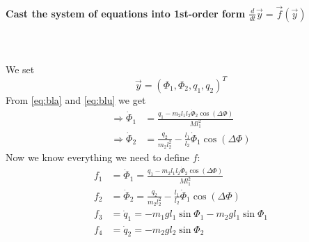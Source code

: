 \documentclass[11 pt]{article}
\begin{document}
        \paragraph{Cast the system of equations into 1st-order form
            $\frac{d}{dt}\vec y=\vec f(\vec y)$
        } \ \\
        \\
        We set
        \begin{equation}
            \vec y=(\Phi_1,\Phi_2,q_1,q_2)^T
        \end{equation}
        From \autoref{eq:bla} and \autoref{eq:blu} we get
        \begin{align}
            \Rightarrow\dot\Phi_1
            &=\frac{q_1-m_2l_1l_2\dot\Phi_2\cos(\Delta\Phi)}{Ml_1^2} \\
            \Rightarrow\dot\Phi_2
            &=\frac{q_2}{m_2l_2^2}-\frac{l_1}{l_2}\dot\Phi_1\cos(\Delta\Phi)
        \end{align}
        Now we know everything we need to define $f$:
        \begin{align}
            f_1&=\dot\Phi_1=
            \frac{q_1-m_2l_1l_2\dot\Phi_2\cos(\Delta\Phi)}{Ml_1^2} \\
            f_2&=\dot\Phi_2=
            \frac{q_2}{m_2l_2^2}-\frac{l_1}{l_2}\dot\Phi_1\cos(\Delta\Phi) \\
            f_3&=\dot{q}_1=-m_1gl_1\sin{\Phi_1}-m_2gl_1\sin{\Phi_1} \\
            f_4&=\dot{q}_2=-m_2gl_2\sin{\Phi_2} \\
        \end{align} 
\end{document}
